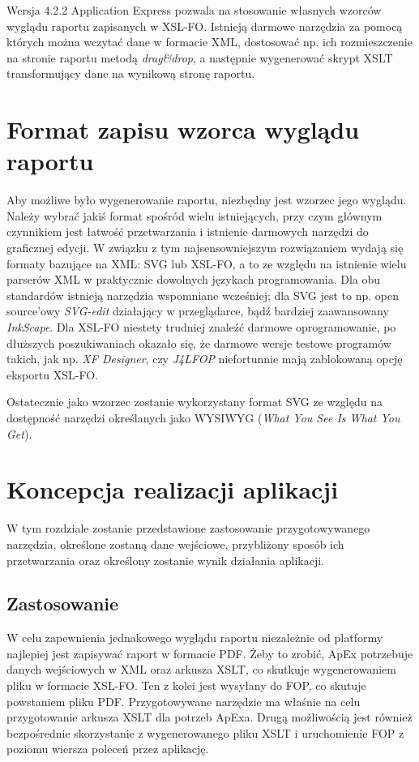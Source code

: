 \documentclass[11pt,a4paper]{article}
\begin{document}
Wersja 4.2.2 Application Express pozwala na stosowanie własnych wzorców wyglądu raportu zapisanych w XSL-FO. Istnieją darmowe narzędzia za pomocą których można wczytać dane w formacie XML, dostosować np. ich rozmieszczenie na stronie raportu metodą \emph{drag\&drop}, a następnie wygenerować skrypt XSLT transformujący dane na wynikową stronę raportu. 

\section{Format zapisu wzorca wyglądu raportu}\label{sec:formatywzorce}
Aby możliwe było wygenerowanie raportu, niezbędny jest wzorzec jego wyglądu. Należy wybrać jakiś format spośród wielu istniejących, przy czym głównym czynnikiem jest łatwość przetwarzania i istnienie darmowych narzędzi do graficznej edycji. W związku z tym najsensowniejszym rozwiązaniem wydają się formaty bazujące na XML: SVG lub XSL-FO, a to ze względu na istnienie wielu parserów XML w praktycznie dowolnych językach programowania. Dla obu standardów istnieją narzędzia wspomniane wcześniej; dla SVG jest to np. open source'owy \emph{SVG-edit} działający w przeglądarce, bądź bardziej zaawansowany \emph{InkScape}. Dla XSL-FO niestety trudniej znaleźć darmowe oprogramowanie, po dłuższych poszukiwaniach okazało się, że darmowe wersje testowe programów takich, jak np. \emph{XF Designer}, czy \emph{J4LFOP} niefortunnie mają zablokowaną opcję eksportu XSL-FO. 

Ostatecznie jako wzorzec zostanie wykorzystany format SVG ze względu na dostępność narzędzi określanych jako WYSIWYG (\emph{What You See Is What You Get}).

\section{Koncepcja realizacji aplikacji}
W tym rozdziale zostanie przedstawione zastosowanie przygotowywanego narzędzia, określone zostaną dane wejściowe, przybliżony sposób ich przetwarzania oraz określony zostanie wynik działania aplikacji.

\subsection{Zastosowanie}\label{sec:appZast}
W celu zapewnienia jednakowego wyglądu raportu niezależnie od platformy najlepiej jest zapisywać raport w formacie PDF. Żeby to zrobić, ApEx potrzebuje danych wejściowych w XML oraz arkusza XSLT, co skutkuje wygenerowaniem pliku w formacie XSL-FO. Ten z kolei jest wysyłany do FOP, co skutuje powstaniem pliku PDF. Przygotowywane narzędzie ma właśnie na celu przygotowanie arkusza XSLT dla potrzeb ApExa. Drugą możliwością jest również bezpośrednie skorzystanie z wygenerowanego pliku XSLT i uruchomienie FOP z poziomu wiersza poleceń przez aplikację. 
\end{document}
